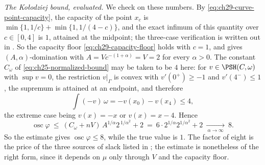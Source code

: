 \begin{example}
\emph{The Ko\l odziej bound, evaluated.}  We check
 on these numbers.  By
\eqref{eq:ch29-curve-point-capacity}, the capacity of the point \(x_c\) is
\(\min\{1,1/c\}+\min\{1,1/(4-c)\}\), and the exact infimum of this quantity
over \(c\in[0,4]\) is \(1\), attained at the midpoint; the three-case
verification is written out in .  So the
capacity floor \eqref{eq:ch29-capacity-floor} holds with \(c=1\), and
 gives \((A,\alpha)\)-domination with
\(A=Vc^{-(1+\alpha)}=V=2\) for every \(\alpha>0\).  The constant
\(C_\omega\) of
\eqref{eq:ch25-normalized-bound} may be taken to be \(4\) here: for
\(v\in\PSH(C,\omega)\) with \(\sup v=0\), the restriction \(v|_\Gamma\) is
convex with \(v'(0^+)\geq-1\) and \(v'(4^-)\leq1\), the supremum is attained
at an endpoint, and therefore
\[
 \int(-v)\,\omega=-v(x_0)-v(x_4)\leq4 ,
\]
the extreme case being \(v(x)=-x\) or \(v(x)=x-4\).  Hence
\begin{equation}
\label{eq:ch29-curve-kolodziej-numbers}
 \operatorname{osc}\varphi
 \ \leq\ (C_\omega+nV)\,A^{1/\alpha}2^{\,1/\alpha^2}+2
 \ =\ 6\cdot2^{1/\alpha}2^{1/\alpha^2}+2
 \ \xrightarrow[\ \alpha\to\infty\ ]{}\ 8 .
\end{equation}
So the estimate gives \(\operatorname{osc}\varphi\leq8\), while the true
value is \(1\).  The factor of eight is the price of the three sources of
slack listed in ; the estimate is nonetheless
of the right form, since it depends on \(\mu\) only through \(V\) and the
capacity floor.
\end{example}

